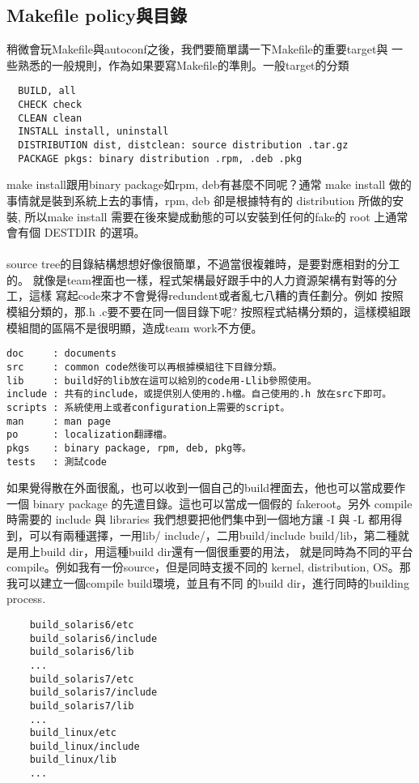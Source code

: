   \subsection{Makefile policy與目錄}
  稍微會玩Makefile與autoconf之後，我們要簡單講一下Makefile的重要target與
  一些熟悉的一般規則，作為如果要寫Makefile的準則。一般target的分類
  \begin{verbatim}
  BUILD, all
  CHECK check
  CLEAN clean
  INSTALL install, uninstall
  DISTRIBUTION dist, distclean: source distribution .tar.gz
  PACKAGE pkgs: binary distribution .rpm, .deb .pkg
  \end{verbatim}
  make install跟用binary package如rpm, deb有甚麼不同呢？通常 make install
  做的事情就是裝到系統上去的事情，rpm, deb 卻是根據特有的 distribution
  所做的安裝, 所以make install 需要在後來變成動態的可以安裝到任何的fake的
  root 上通常會有個 DESTDIR 的選項。
  \\\\
  source tree的目錄結構想想好像很簡單，不過當很複雜時，是要對應相對的分工的。
  就像是team裡面也一樣，程式架構最好跟手中的人力資源架構有對等的分工，這樣
  寫起code來才不會覺得redundent或者亂七八糟的責任劃分。例如
  按照模組分類的，那.h .c要不要在同一個目錄下呢?
  按照程式結構分類的，這樣模組跟模組間的區隔不是很明顯，造成team work不方便。
  \begin{verbatim}
doc     : documents
src     : common code然後可以再根據模組往下目錄分類。
lib     : build好的lib放在這可以給別的code用-Llib參照使用。
include : 共有的include，或提供別人使用的.h檔。自己使用的.h 放在src下即可。
scripts : 系統使用上或者configuration上需要的script。
man     : man page
po      : localization翻譯檔。
pkgs    : binary package, rpm, deb, pkg等。
tests   : 測試code
  \end{verbatim}
    如果覺得散在外面很亂，也可以收到一個自己的build裡面去，他也可以當成要作一個
    binary package 的先遣目錄。這也可以當成一個假的 fakeroot。另外
    compile 時需要的 include 與 libraries 我們想要把他們集中到一個地方讓
    -I 與 -L 都用得到，可以有兩種選擇，一用lib/ include/，二用build/include
    build/lib，第二種就是用上build dir，用這種build dir還有一個很重要的用法，
    就是同時為不同的平台compile。例如我有一份source，但是同時支援不同的
    kernel, distribution, OS。那我可以建立一個compile build環境，並且有不同
    的build dir，進行同時的building process.
    \begin{verbatim}
    build_solaris6/etc
    build_solaris6/include
    build_solaris6/lib
    ...
    build_solaris7/etc
    build_solaris7/include
    build_solaris7/lib
    ...
    build_linux/etc
    build_linux/include
    build_linux/lib
    ...
    \end{verbatim}
